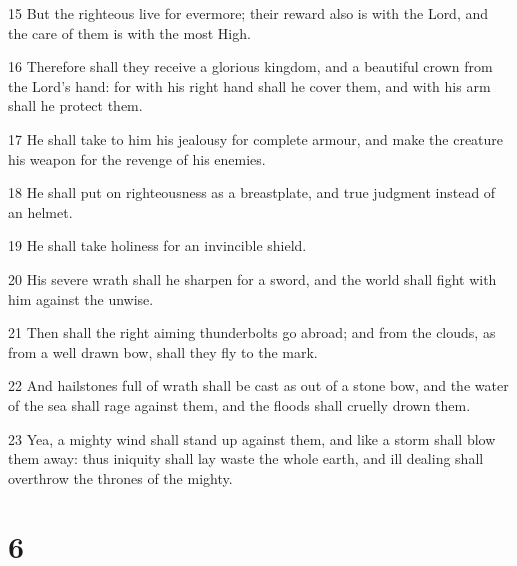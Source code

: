 \par 15 But the righteous live for evermore; their reward also is with the Lord, and the care of them is with the most High.
\par 16 Therefore shall they receive a glorious kingdom, and a beautiful crown from the Lord's hand: for with his right hand shall he cover them, and with his arm shall he protect them.
\par 17 He shall take to him his jealousy for complete armour, and make the creature his weapon for the revenge of his enemies.
\par 18 He shall put on righteousness as a breastplate, and true judgment instead of an helmet.
\par 19 He shall take holiness for an invincible shield.
\par 20 His severe wrath shall he sharpen for a sword, and the world shall fight with him against the unwise.
\par 21 Then shall the right aiming thunderbolts go abroad; and from the clouds, as from a well drawn bow, shall they fly to the mark.
\par 22 And hailstones full of wrath shall be cast as out of a stone bow, and the water of the sea shall rage against them, and the floods shall cruelly drown them.
\par 23 Yea, a mighty wind shall stand up against them, and like a storm shall blow them away: thus iniquity shall lay waste the whole earth, and ill dealing shall overthrow the thrones of the mighty.

\chapter{6}

